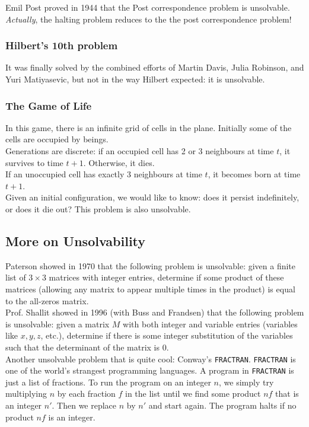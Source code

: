 \documentclass[12pt]{article}
\theoremstyle{plain}
\theoremstyle{definition}
\begin{document}
Emil Post proved in 1944 that the Post correspondence problem is unsolvable. \\

\emph{Actually}, the halting problem reduces to the the post correspondence problem!

\subsubsection{Hilbert's 10th problem}
It was finally solved by the combined efforts of Martin Davis, Julia Robinson, and Yuri Matiyasevic, but not in the way Hilbert expected: it is unsolvable.

\subsubsection{The Game of Life}
In this game, there is an infinite grid of cells in the plane.
Initially some of the cells are occupied by beings. \\
Generations are discrete: if an occupied cell has 2 or 3 neighbours at time $t$, it survives to time $t+1$.
Otherwise, it dies. \\
If an unoccupied cell has exactly 3 neighbours at time $t$, it becomes born at time $t+1$. \\

Given an initial configuration, we would like to know: does it persist indefinitely, or does it die out?
This problem is also unsolvable.

\subsection{More on Unsolvability}
Paterson showed in 1970 that the following problem is unsolvable: given a finite list of $3 \times 3$ matrices with integer entries, determine if some product of these matrices (allowing any matrix to appear multiple times in the product) is equal to the all-zeros matrix. \\

Prof. Shallit showed in 1996 (with Buss and Frandsen) that the following problem is unsolvable: given a matrix $M$ with both integer and variable entries (variables like $x, y, z$, etc.), determine if there is some integer substitution of the variables such that the determinant of the matrix is 0. \\

Another unsolvable problem that is quite cool: Conway's \texttt{FRACTRAN}.
\texttt{FRACTRAN} is one of the world's strangest programming languages.
A program in \texttt{FRACTRAN} is just a list of fractions.
To run the program on an integer $n$, we simply try multiplying $n$ by each fraction $f$ in the list until we find some product $nf$ that is an integer $n'$.
Then we replace $n$ by $n'$ and start again.
The program halts if no product $nf$ is an integer. \\
\end{document}
